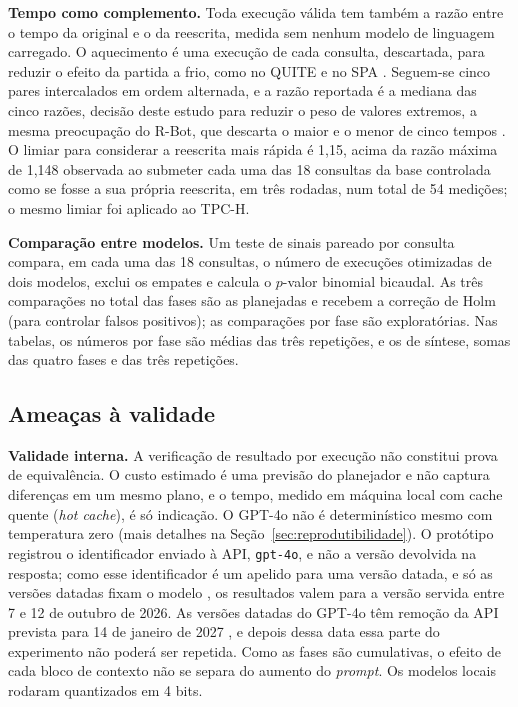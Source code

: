 \documentclass[12pt]{article}
\begin{document}
\textbf{Tempo como complemento.} Toda execução válida tem também a razão entre o tempo da original e o da reescrita, medida sem nenhum modelo de linguagem carregado. O aquecimento é uma execução de cada consulta, descartada, para reduzir o efeito da partida a frio, como no QUITE e no SPA \cite{song2025quite,huang2026spa}. Seguem-se cinco pares intercalados em ordem alternada, e a razão reportada é a mediana das cinco razões, decisão deste estudo para reduzir o peso de valores extremos, a mesma preocupação do R-Bot, que descarta o maior e o menor de cinco tempos \cite{sun2025rbot}. O limiar para considerar a reescrita mais rápida é 1,15, acima da razão máxima de 1,148 observada ao submeter cada uma das 18 consultas da base controlada como se fosse a sua própria reescrita, em três rodadas, num total de 54 medições; o mesmo limiar foi aplicado ao TPC-H.

\textbf{Comparação entre modelos.} Um teste de sinais pareado por consulta compara, em cada uma das 18 consultas, o número de execuções otimizadas de dois modelos, exclui os empates e calcula o $p$-valor binomial bicaudal. As três comparações no total das fases são as planejadas e recebem a correção de Holm (para controlar falsos positivos); as comparações por fase são exploratórias. Nas tabelas, os números por fase são médias das três repetições, e os de síntese, somas das quatro fases e das três repetições.

\subsection{Ameaças à validade}
\label{sec:ameacas}

\textbf{Validade interna.} A verificação de resultado por execução não constitui prova de equivalência. O custo estimado é uma previsão do planejador e não captura diferenças em um mesmo plano, e o tempo, medido em máquina local com cache quente (\textit{hot cache}), é só indicação. O GPT-4o não é determinístico mesmo com temperatura zero (mais detalhes na Seção~\ref{sec:reprodutibilidade}). O protótipo registrou o identificador enviado à API, \texttt{gpt-4o}, e não a versão devolvida na resposta; como esse identificador é um apelido para uma versão datada, e só as versões datadas fixam o modelo \cite{openai2026gpt4o}, os resultados valem para a versão servida entre 7 e 12 de outubro de 2026. As versões datadas do GPT-4o têm remoção da API prevista para 14 de janeiro de 2027 \cite{openai2026deprecations}, e depois dessa data essa parte do experimento não poderá ser repetida. Como as fases são cumulativas, o efeito de cada bloco de contexto não se separa do aumento do \textit{prompt}. Os modelos locais rodaram quantizados em 4 bits.
\end{document}
